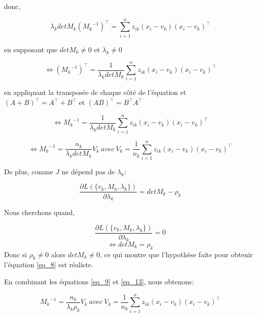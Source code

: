 \documentclass[a4paper,11pt,oneside,roman]{article}
\begin{document}
    donc,

    \begin{equation}
        \lambda_k det M_k ({M_k}^{-1})^\top = \sum^{n}_{i=1} z_{ik} (x_i-v_k)(x_i-v_k)^\top
    \end{equation}

    en supposant que $det M_k \neq 0$ et $\lambda_k \neq 0$

    \begin{equation}
        \iff ({M_k}^{-1})^\top = \frac{1}{\lambda_k det M_k }\sum^{n}_{i=1} z_{ik} (x_i-v_k)(x_i-v_k)^\top
        \label{eq_8}
    \end{equation}

    en appliquant la transposée de chaque côté de l'équation et $(A+B)^\top = A^\top + B^\top$ et $(AB)^\top = B^\top A^\top$

    \begin{equation}
        \iff {M_k}^{-1} = \frac{1}{\lambda_k det M_k }\sum^{n}_{i=1} z_{ik} (x_i-v_k)(x_i-v_k)^\top
    \end{equation}

    \begin{equation}
        \iff {M_k}^{-1} = \frac{n_k}{\lambda_k det M_k }V_k \ avec \ V_k = \frac{1}{n_k}\sum^{n}_{i=1} z_{ik} (x_i-v_k)(x_i-v_k)^\top
        \label{eq_9}
    \end{equation}

    De plus, comme $J$ ne dépend pas de $\lambda_k$:

    \begin{equation}
        \frac{\partial L(\{v_k, M_k, \lambda_k\})}{\partial \lambda_k} = detM_k - \rho_k
    \end{equation}
    
    Nous cherchons quand,

    \begin{equation}
        \frac{\partial L(\{v_k, M_k, \lambda_k\})}{\partial \lambda_k} = 0
    \end{equation}
    \begin{equation}
        \iff detM_k = \rho_k
        \label{eq_13}
    \end{equation}
    Donc si $\rho_k \neq 0$ alors $det M_k \neq 0$, ce qui montre que l'hypothèse faite pour obtenir l'équation \ref{eq_8} est réaliste.

    En combinant les équations \ref{eq_9} et \ref{eq_13}, nous obtenons:

    \begin{equation}
        {M_k}^{-1} = \frac{n_k}{\lambda_k \rho_k }V_k \ avec \ V_k = \frac{1}{n_k}\sum^{n}_{i=1} z_{ik} (x_i-v_k)(x_i-v_k)^\top
    \end{equation}

    
\end{document}
